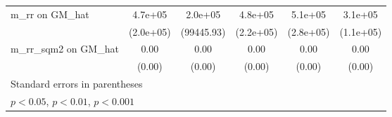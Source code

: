 {\begin{tabular}{l*{5}{c}}
\addlinespace
m\_rr on GM\_hat  &  4.7e+05\sym{*}  &  2.0e+05\sym{*}  &  4.8e+05\sym{*}  &  5.1e+05         &  3.1e+05\sym{**} \\
                &(2.0e+05)         &(99445.93)         &(2.2e+05)         &(2.8e+05)         &(1.1e+05)         \\
\addlinespace
m\_rr\_sqm2 on GM\_hat&     0.00\sym{*}  &     0.00\sym{**} &     0.00\sym{**} &     0.00         &     0.00\sym{***}\\
                &   (0.00)         &   (0.00)         &   (0.00)         &   (0.00)         &   (0.00)         \\
\bottomrule
\multicolumn{6}{l}{\footnotesize Standard errors in parentheses}\\
\multicolumn{6}{l}{\footnotesize \sym{*} \(p<0.05\), \sym{**} \(p<0.01\), \sym{***} \(p<0.001\)}\\
\end{tabular}
}
